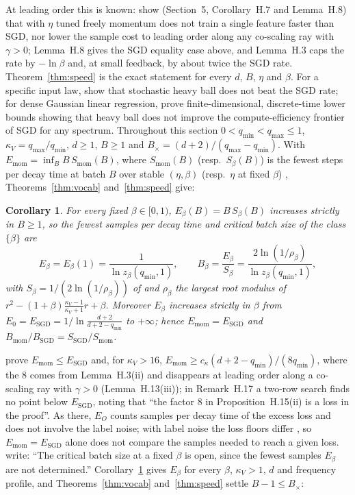 \documentclass[11pt]{article}
\newtheorem{corollary}[theorem]{Corollary}
\begin{document}
At leading order this is known: \citet{everett2026sparse} show (Section~5, Corollary~H.7 and Lemma~H.8) that with $\eta$ tuned freely momentum does not train a single feature faster than SGD, nor lower the sample cost to leading order along any co-scaling ray with $\gamma>0$; Lemma~H.8 gives the SGD equality case above, and Lemma~H.3 caps the rate by $-\ln\beta$ and, at small feedback, by about twice the SGD rate. Theorem~\ref{thm:speed} is the exact statement for every $d$, $B$, $\eta$ and $\beta$. For a specific input law, \citet{kidambi2018insufficiency} show that stochastic heavy ball does not beat the SGD rate; for dense Gaussian linear regression, \citet{morwani2026compute} prove finite-dimensional, discrete-time lower bounds showing that heavy ball does not improve the compute-efficiency frontier of SGD for any spectrum. Throughout this section $0<q_{\min}<q_{\max}\le1$, $\kappa_V=q_{\max}/q_{\min}$, $d\ge1$, $B\ge1$ and $B_\times=(d+2)/(q_{\max}-q_{\min})$. With $E_{\mathrm{mom}}=\inf_B B\,S_{\mathrm{mom}}(B)$, where $S_{\mathrm{mom}}(B)$ (resp.\ $S_\beta(B)$) is the fewest steps per decay time at batch $B$ over stable $(\eta,\beta)$ (resp.\ $\eta$ at fixed $\beta$) \citep[Proposition~H.15]{everett2026sparse}, Theorems~\ref{thm:vocab} and~\ref{thm:speed} give:

\begin{corollary}\label{cor:emom}
For every fixed $\beta\in[0,1)$, $E_\beta(B)=B\,S_\beta(B)$ increases strictly in $B\ge1$, so the fewest samples per decay time and critical batch size of the class $\{\beta\}$ are
\[
E_\beta=E_\beta(1)=\frac1{\ln z_\beta(q_{\min},1)},\qquad B_\beta=\frac{E_\beta}{S_\beta}=\frac{2\ln(1/\rho_\beta)}{\ln z_\beta(q_{\min},1)},
\]
with $S_\beta=1/(2\ln(1/\rho_\beta))$ of \citet[Proposition~H.15(iv)]{everett2026sparse} and $\rho_\beta$ the largest root modulus of $r^2-(1+\beta)\frac{\kappa_V-1}{\kappa_V+1}r+\beta$. Moreover $E_\beta$ increases strictly in $\beta$ from $E_0=E_{\mathrm{SGD}}=1/\ln\frac{d+2}{d+2-q_{\min}}$ to $+\infty$; hence $E_{\mathrm{mom}}=E_{\mathrm{SGD}}$ and $B_{\mathrm{mom}}/B_{\mathrm{SGD}}=S_{\mathrm{SGD}}/S_{\mathrm{mom}}$.
\end{corollary}

\citet[Proposition~H.15(ii)]{everett2026sparse} prove $E_{\mathrm{mom}}\le E_{\mathrm{SGD}}$ and, for $\kappa_V>16$, $E_{\mathrm{mom}}\ge c_\kappa(d+2-q_{\min})/(8q_{\min})$, where the $8$ comes from Lemma~H.3(ii) and disappears at leading order along a co-scaling ray with $\gamma>0$ (Lemma~H.13(iii)); in Remark~H.17 a two-row search finds no point below $E_{\mathrm{SGD}}$, noting that ``the factor $8$ in Proposition~H.15(ii) is a loss in the proof''. As there, $E_O$ counts samples per decay time of the excess loss and does not involve the label noise; with label noise the loss floors differ \citep[after Proposition~H.15]{everett2026sparse}, so $E_{\mathrm{mom}}=E_{\mathrm{SGD}}$ alone does not compare the samples needed to reach a given loss. \citet[Appendix~A.4]{everett2026sparse} write: ``The critical batch size at a fixed $\beta$ is open, since the fewest samples $E_\beta$ are not determined.'' Corollary~\ref{cor:emom} gives $E_\beta$ for every $\beta$, $\kappa_V>1$, $d$ and frequency profile, and Theorems~\ref{thm:vocab} and~\ref{thm:speed} settle $B-1\le B_\times$:
\end{document}
